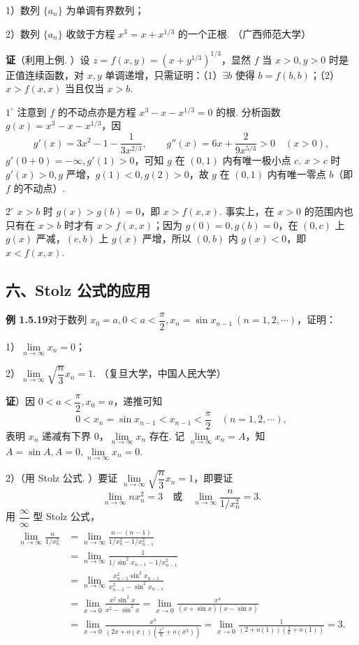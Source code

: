 \documentclass[UTF8,12pt,a4paper,fontset=fandol]{ctexart}
\begin{document}
1）数列 $\{a_n\}$ 为单调有界数列；

2）数列 $\{a_n\}$ 收敛于方程 $x^3=x+x^{1/3}$ 的一个正根. （广西师范大学）

\noindent\textbf{证}\quad （利用上例. ）设 $z=f(x,y)=(x+y^{1/3})^{1/3}$，显然 $f$ 当 $x>0,y>0$ 时是正值连续函数，对 $x,y$ 单调递增，只需证明：（1）$\exists b$ 使得 $b=f(b,b)$；（2）$x>f(x,x)$ 当且仅当 $x>b$.

$1^\circ$ 注意到 $f$ 的不动点亦是方程 $x^3-x-x^{1/3}=0$ 的根. 分析函数 $g(x)=x^3-x-x^{1/3}$，因
\[
  g'(x)=3x^2-1-\frac1{3x^{2/3}},\qquad
  g''(x)=6x+\frac{2}{9x^{5/3}}>0\quad (x>0),
\]
$g'(0+0)=-\infty,g'(1)>0$，可知 $g$ 在 $(0,1)$ 内有唯一极小点 $c$. $x>c$ 时 $g'(x)>0,g$ 严增，$g(1)<0,g(2)>0$，故 $g$ 在 $(0,1)$ 内有唯一零点 $b$（即 $f$ 的不动点）.

$2^\circ$ $x>b$ 时 $g(x)>g(b)=0$，即 $x>f(x,x)$. 事实上，在 $x>0$ 的范围内也只有在 $x>b$ 时才有 $x>f(x,x)$；因为 $g(0)=0,g(b)=0$，在 $(0,c)$ 上 $g(x)$ 严减，$(c,b)$ 上 $g(x)$ 严增，所以 $(0,b)$ 内 $g(x)<0$，即 $x<f(x,x)$.

\subsection*{六、Stolz 公式的应用}

\noindent\textbf{例 1.5.19}\quad 对于数列 $x_0=a,0<a<\dfrac{\pi}{2},x_n=\sin x_{n-1}\ (n=1,2,\cdots)$，证明：

1）$\lim\limits_{n\to\infty}x_n=0$；

2）$\lim\limits_{n\to\infty}\sqrt{\dfrac{n}{3}}x_n=1$. （复旦大学，中国人民大学）

\noindent\textbf{证}）因 $0<a<\dfrac{\pi}{2},x_0=a$，递推可知
\[
  0<x_n=\sin x_{n-1}<x_{n-1}<\frac{\pi}{2}\quad (n=1,2,\cdots),
\]
表明 $x_n$ 递减有下界 $0$，$\lim\limits_{n\to\infty}x_n$ 存在. 记 $\lim\limits_{n\to\infty}x_n=A$，知 $A=\sin A,A=0,\lim\limits_{n\to\infty}x_n=0$.

2）（用 Stolz 公式. ）要证 $\lim\limits_{n\to\infty}\sqrt{\dfrac{n}{3}}x_n=1$，即要证
\[
  \lim_{n\to\infty} nx_n^2=3
  \quad\text{或}\quad
  \lim_{n\to\infty}\frac{n}{1/x_n^2}=3.
\]
用 $\dfrac{\infty}{\infty}$ 型 Stolz 公式，
\[
\begin{aligned}
  \lim_{n\to\infty}\frac{n}{1/x_n^2}
  &=\lim_{n\to\infty}\frac{n-(n-1)}{1/x_n^2-1/x_{n-1}^2}\\
  &=\lim_{n\to\infty}\frac{1}{1/\sin^2 x_{n-1}-1/x_{n-1}^2}\\
  &=\lim_{n\to\infty}\frac{x_{n-1}^2\sin^2 x_{n-1}}{x_{n-1}^2-\sin^2 x_{n-1}}\\
  &=\lim_{x\to 0}\frac{x^2\sin^2 x}{x^2-\sin^2 x}
   =\lim_{x\to 0}\frac{x^4}{(x+\sin x)(x-\sin x)}\\
  &=\lim_{x\to 0}\frac{x^4}{(2x+o(x))\left(\frac{x^3}{6}+o(x^3)\right)}
   =\lim_{x\to 0}\frac{1}{(2+o(1))\left(\frac16+o(1)\right)}
   =3.
\end{aligned}
\]
\end{document}
